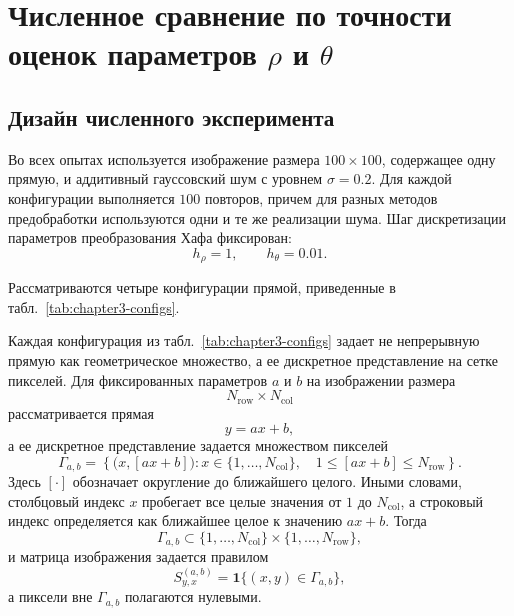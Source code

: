 \chapter{Численное сравнение по точности оценок параметров $\rho$ и $\theta$}

\section{Дизайн численного эксперимента}

Во всех опытах используется изображение размера $100\times100$, содержащее
одну прямую, и аддитивный гауссовский шум с уровнем $\sigma=0.2$. Для каждой
конфигурации выполняется $100$ повторов, причем для разных методов
предобработки используются одни и те же реализации шума. Шаг дискретизации
параметров преобразования Хафа фиксирован:
\[
h_\rho = 1,
\qquad
h_\theta = 0.01.
\]

Рассматриваются четыре конфигурации прямой, приведенные в
табл.~\ref{tab:chapter3-configs}.

\begin{table}[H]
	\centering
	\caption{Конфигурации прямой в численном эксперименте}
	\label{tab:chapter3-configs}
\end{table}

Каждая конфигурация из табл.~\ref{tab:chapter3-configs} задает не непрерывную
прямую как геометрическое множество, а ее дискретное представление на сетке
пикселей. Для фиксированных параметров $a$ и $b$ на изображении размера
\[
N_{\mathrm{row}} \times N_{\mathrm{col}}
\]
рассматривается прямая
\[
y = ax + b,
\]
а ее дискретное представление задается множеством пикселей
\[
\Gamma_{a,b}
=
\left\{
\bigl(x,[ax+b]\bigr)
\colon
x\in\{1,\dots,N_{\mathrm{col}}\},
\quad
1 \le [ax+b] \le N_{\mathrm{row}}
\right\}.
\]
Здесь $[\cdot]$ обозначает округление до ближайшего целого. Иными словами,
столбцовый индекс $x$ пробегает все целые значения от $1$ до $N_{\mathrm{col}}$,
а строковый индекс определяется как ближайшее целое к значению $ax+b$.
Тогда
\[
\Gamma_{a,b}
\subset
\{1,\dots,N_{\mathrm{col}}\}\times\{1,\dots,N_{\mathrm{row}}\},
\]
и матрица изображения задается правилом
\[
S^{(a,b)}_{y,x} =
\mathbf{1}\bigl\{(x,y)\in \Gamma_{a,b}\bigr\},
\]
а пиксели вне $\Gamma_{a,b}$ полагаются нулевыми.

